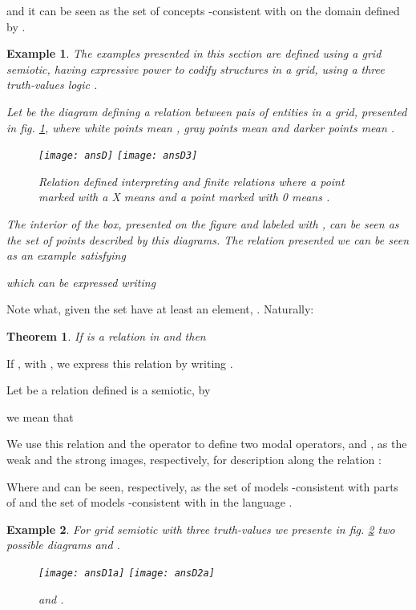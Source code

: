 \documentclass[oribibl]{llncs}
\newtheorem{thm}{Theorem}
\newtheorem{exam}{Example}
\begin{document}
and it can be seen as the set of concepts -consistent with  on the domain defined by .
\begin{exam}
The examples presented in this section are defined using a grid semiotic, having expressive power to codify structures in a grid, using a three truth-values logic .

Let  be the diagram defining a relation between pais of entities in a grid, presented in fig. \ref{grid1}, where white points  mean , gray points mean  and darker points  mean .

\begin{figure}[h]
\begin{center}
\texttt{[image: ansD]} \hspace{1cm}
\texttt{[image: ansD3]}
\end{center}
\caption{Relation defined interpreting  and finite relations  where a point  marked with a X means  and a point marked with 0 means .}\label{grid1}
\end{figure}

  The interior of the box, presented on the figure and labeled with , can be seen as the set of points described by this diagrams. The relation  presented we can be seen as an example satisfying

which can be expressed writing

\end{exam}


Note what, given  the set  have at least an element, . Naturally:
\begin{thm}
If  is a relation in  and  then

\end{thm}
If , with , we express this relation by writing .

Let  be a relation defined is a semiotic, by
  
we mean that
  
We use this relation and the operator  to define two
modal operators,  and , as the
weak and the strong images, respectively, for description  along the relation :


Where  and  can be seen,
respectively, as the set of models -consistent with parts
of  and the set of models -consistent with  in the
language .
\begin{exam}
For grid semiotic with three truth-values we presente in fig. \ref{grid2} two possible diagrams  and .

\begin{figure}[h]
\begin{center}
\texttt{[image: ansD1a]} \hspace{1cm}
\texttt{[image: ansD2a]}
\end{center}
\caption{ and .}\label{grid2}
\end{figure}
\end{exam}
\end{document}
